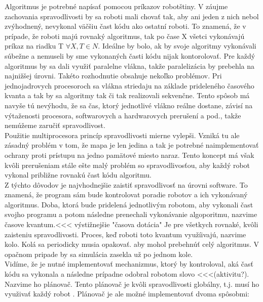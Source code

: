 Algoritmus je potrebné napísať pomocou príkazov robotštiny. V záujme zachovania spravodlivosti by sa roboti mali chovať tak, aby ani jeden z nich nebol zvýhodnený, nevykonal väčšiu čast kódu ako ostatní roboti. To znamená, že v prípade, že roboti majú rovnaký algoritmus, tak po čase X všetci vykonávajú príkaz na riadku T $ \forall X,T \in N $.  Ideálne by bolo, ak by svoje algoritmy vykonávali súbežne a nemuseli by sme vykonaných časti kódu nijak kontorolovať. Pre každý algoritmus by sa dali využiť paralelne vlákna, takže paralelizácia by prebehla na najnižšej úrovni. Takéto rozhodnutie obsahuje nekoľko problémov. Pri jednojadrovych procesoroch sa vlákna striedaju na základe prideleného časového kvanta a tak by sa algoritmy tak či tak realizovali sekvenčne. Tento spôsob má navyše tú nevýhodu, že sa čas, ktorý jednotlivé vlákno reálne dostane, závisí na výtaženosti procesora, softwarovych a hardwarovych prerušení a pod., takže nemúžeme zaručiť spravodlivost. \\
Použitie multiprocesora princíp spravodlivosti mierne vylepši. Vzniká tu ale zásadný problém v tom, že mapa je len jedina a tak je potrebné naimplementovať ochrany proti prístupu na jedno pamätové miesto naraz. Tento koncept má však kvôli prerušeniam stále ešte malý problém so spravodlivosťou, aby každý robot vykonal približne rovnakú čast kódu algoritmu. \\ %
Z týchto dôvodov je najvhodnejšie zaistiť spravodlivosť na úrovni software. To znamená, že program sám bude kontrolovat poradie robotov a ich vykonávaný algoritmus.
Doba, ktorá bude pridelená jednotlivým robotom, aby vykonali čast svojho programu a potom následne prenechali vykonávanie algoporitmu, nazvime časove kvantum.<<< výstižnejšie "časova dotácia" Je pre všetkych rovnaké, kvôli zaisteniu spravodlivosti. Proces, keď roboti toto kvantum využíivajú, nazvime kolo.%
Kolá sa periodicky musia opakovať. aby mohol prebehnúť celý algoritmus. V opačnom pripade by sa simulácia zasekla už po jednom kole. \\
Vidíme,  že je nutné implementovať mechanizmus, ktorý by kontroloval, aká časť kódu sa vykonala a následne prípadne odobral robotom slovo <<<(aktivitu?). Nazvime ho plánovač. Tento plánovač je kvôli spravodlivosti globálny,  t.j. musí ho využivať každý robot . %
Plánovač je ale možné implementovať dvoma spôsobmi:
